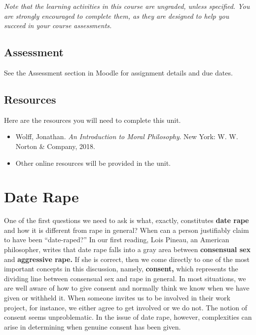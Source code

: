 \documentclass[
]{book}
\providecommand{\tightlist}{%
  \setlength{\itemsep}{0pt}\setlength{\parskip}{0pt}}
\begin{document}
\emph{Note that the learning activities in this course are ungraded, unless specified. You are strongly encouraged to complete them, as they are designed to help you succeed in your course assessments.}

\hypertarget{assessment-6}{%
\subsection*{Assessment}\label{assessment-6}}

See the Assessment section in Moodle for assignment details and due dates.

\hypertarget{resources-3}{%
\subsection*{Resources}\label{resources-3}}

Here are the resources you will need to complete this unit.

\begin{itemize}
\tightlist
\item
  Wolff, Jonathan. \emph{An Introduction to Moral Philosophy}. New York: W. W. Norton \& Company, 2018.
\item
  Other online resources will be provided in the unit.
\end{itemize}

\hypertarget{date-rape}{%
\section{Date Rape}\label{date-rape}}

One of the first questions we need to ask is what, exactly, constitutes \textbf{date rape} and how it is different from rape in general? When can a person justifiably claim to have been ``date-raped?'' In our first reading, Lois Pineau, an American philosopher, writes that date rape falls into a gray area between \textbf{consensual sex} and \textbf{aggressive rape.} If she is correct, then we come directly to one of the most important concepts in this discussion, namely, \textbf{consent,} which represents the dividing line between consensual sex and rape in general. In most situations, we are well aware of how to give consent and normally think we know when we have given or withheld it. When someone invites us to be involved in their work project, for instance, we either agree to get involved or we do not. The notion of consent seems unproblematic. In the issue of date rape, however, complexities can arise in determining when genuine consent has been given.
\end{document}
